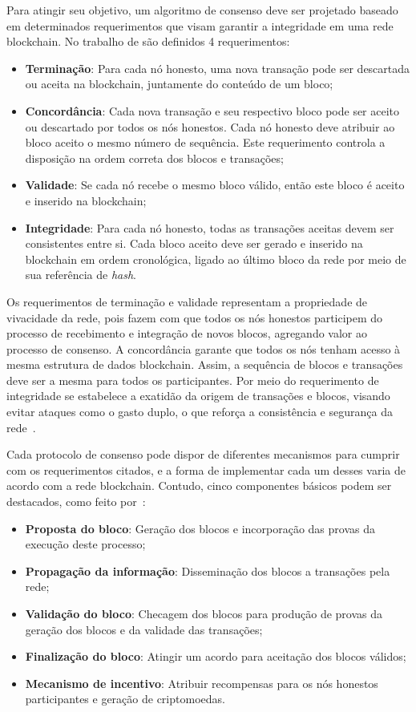 Para atingir seu objetivo, um algoritmo de consenso deve ser projetado baseado em determinados requerimentos que visam garantir a integridade em uma rede blockchain. No trabalho de  são definidos 4 requerimentos:

\begin{itemize}
    \item \textbf{Terminação}: Para cada nó honesto, uma nova transação pode ser descartada ou aceita na blockchain, juntamente do conteúdo de um bloco;
    \item \textbf{Concordância}: Cada nova transação e seu respectivo bloco pode ser aceito ou descartado por todos os nós honestos. Cada nó honesto deve atribuir ao bloco aceito o mesmo número de sequência. Este requerimento controla a disposição na ordem correta dos blocos e transações;
    \item \textbf{Validade}: Se cada nó recebe o mesmo bloco válido, então este bloco é aceito e inserido na blockchain;
    \item \textbf{Integridade}: Para cada nó honesto, todas as transações aceitas devem ser consistentes entre si. Cada bloco aceito deve ser gerado e inserido na blockchain em ordem cronológica, ligado ao último bloco da rede por meio de sua referência de \textit{hash}.
\end{itemize} 

Os requerimentos de terminação e validade representam a propriedade de vivacidade da rede, pois fazem com que todos os nós honestos participem do processo de recebimento e integração de novos blocos, agregando valor ao processo de consenso. A concordância garante que todos os nós tenham acesso à mesma estrutura de dados blockchain. Assim, a sequência de blocos e transações deve ser a mesma para todos os participantes. Por meio do requerimento de integridade se estabelece a exatidão da origem de transações e blocos, visando evitar ataques como o gasto duplo, o que reforça a consistência e segurança da rede~\cite{consenso-xiao-2020, consenso-Bouraga2021}.

Cada protocolo de consenso pode dispor de diferentes mecanismos para cumprir com os requerimentos citados, e a forma de implementar cada um desses varia de acordo com a rede blockchain. Contudo, cinco componentes básicos podem ser destacados, como feito por~: 

\begin{itemize}
    \item \textbf{Proposta do bloco}: Geração dos blocos e incorporação das provas da execução deste processo;
    \item \textbf{Propagação da informação}: Disseminação dos blocos a transações pela rede;
    \item \textbf{Validação do bloco}: Checagem dos blocos para produção de provas da geração dos blocos e da validade das transações;
    \item \textbf{Finalização do bloco}: Atingir um acordo para aceitação dos blocos válidos;
    \item \textbf{Mecanismo de incentivo}: Atribuir recompensas para os nós honestos participantes e geração de criptomoedas.
\end{itemize}


